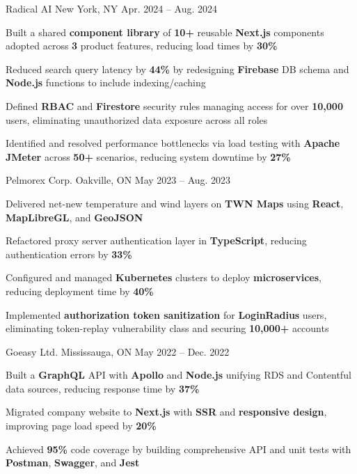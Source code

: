 \documentclass[11pt, a4paper]{awesome-cv}
\begin{document}
\begin{cventries}
  \cventry
    {\color{lightblue}{SOFTWARE ENGINEER INTERN}}
    {Radical AI}
    {New York, NY}
    {Apr. 2024 -- Aug. 2024}
    {
      \begin{cvitems}
        \item{Built a shared \textbf{component library} of \textbf{10+} reusable \textbf{Next.js} components adopted across \textbf{3} product features, reducing load times by \textbf{30\%}}
        \item{Reduced search query latency by \textbf{44\%} by redesigning \textbf{Firebase} DB schema and \textbf{Node.js} functions to include indexing/caching}
        \item{Defined \textbf{RBAC} and \textbf{Firestore} security rules managing access for over \textbf{10,000} users, eliminating unauthorized data exposure across all roles}
        \item{Identified and resolved performance bottlenecks via load testing with \textbf{Apache JMeter} across \textbf{50+} scenarios, reducing system downtime by \textbf{27\%}}
      \end{cvitems}
    }

  \vspace{3mm}

  \cventry
    {\color{lightblue}{SOFTWARE ENGINEER INTERN}}
    {Pelmorex Corp.}
    {Oakville, ON}
    {May 2023 -- Aug. 2023}
    {
      \begin{cvitems}
        \item{Delivered net-new temperature and wind layers on \textbf{TWN Maps} using \textbf{React}, \textbf{MapLibreGL}, and \textbf{GeoJSON}}
        \item{Refactored proxy server authentication layer in \textbf{TypeScript}, reducing authentication errors by \textbf{33\%}}
        \item{Configured and managed \textbf{Kubernetes} clusters to deploy \textbf{microservices}, reducing deployment time by \textbf{40\%}}
        \item{Implemented \textbf{authorization token sanitization} for \textbf{LoginRadius} users, eliminating token-replay vulnerability class and securing \textbf{10,000+} accounts}
      \end{cvitems}
    }

  \vspace{3mm}

  \cventry
    {\color{lightblue}{FRONT-END DEVELOPER INTERN}}
    {Goeasy Ltd.}
    {Mississauga, ON}
    {May 2022 -- Dec. 2022}
    {
      \begin{cvitems}
        \item{Built a \textbf{GraphQL} API with \textbf{Apollo} and \textbf{Node.js} unifying RDS and Contentful data sources, reducing response time by \textbf{37\%}}
        \item{Migrated company website to \textbf{Next.js} with \textbf{SSR} and \textbf{responsive design}, improving page load speed by \textbf{20\%}}
        \item{Achieved \textbf{95\%} code coverage by building comprehensive API and unit tests with \textbf{Postman}, \textbf{Swagger}, and \textbf{Jest}}
      \end{cvitems}
    }


\end{cventries}
\end{document}
